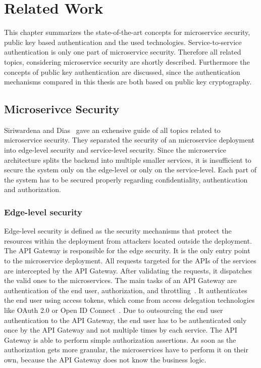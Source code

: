 \chapter{Related Work}
\label{cha:Related_Work}
This chapter summarizes the state-of-the-art concepts for microservice security, public key based authentication and the used technologies.
Service-to-service authentication is only one part of microservice security.
Therefore all related topics, considering microservice security are shortly described.
Furthermore the concepts of public key authentication are discussed, since the authentication mechanisms compared in this thesis are both based on public key cryptography.

\section{Microserivce Security}
Siriwardena and Dias~\cite{dias2020microservices} gave an exhensive guide of all topics related to microservice security. 
They separated the security of an microservice deployment into edge-level security and service-level security.
Since the microservice architecture splits the backend into multiple smaller services, it is insufficient to secure the system only on the edge-level or only on the service-level.
Each part of the system has to be secured properly regarding confidentiality, authentication and authorization.

\subsection{Edge-level security}
Edge-level security is defined as the security mechanisms that protect the resources within the deployment from attackers located outside the deployment. 
The API Gateway is responsible for the edge security.
It is the only entry point to the microservice deployment.
All requests targeted for the APIs of the services are intercepted by the API Gateway.
After validating the requests, it dispatches the valid ones to the microservices.
The main tasks of an API Gateway are authentication of the end user, authorization, and throttling~\cite{dias2020microservices}.
It authenticates the end user using access tokens, which come from access delegation technologies like OAuth 2.0 or Open ID Connect~\cite{siriwardena2014advanced}.
Due to outsourcing the end user authentication to the API Gateway, the end user has to be authenticated only once by the API Gateway and not multiple times by each service.
The API Gateway is able to perform simple authorization assertions. 
As soon as the authorization gets more granular, the microservices have to perform it on their own, because the API Gateway does not know the business logic.

